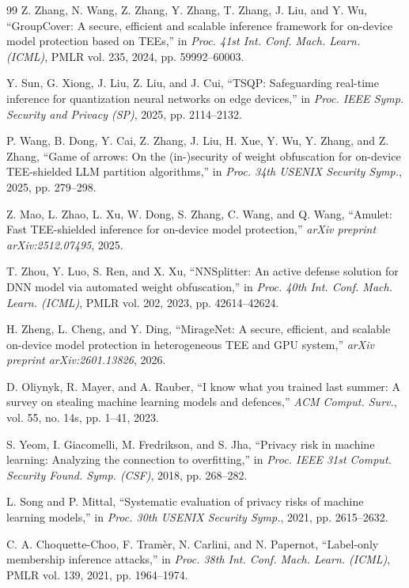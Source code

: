 \documentclass[lettersize,journal]{IEEEtran}
\begin{document}
\begin{thebibliography}{99}
Z. Zhang, N. Wang, Z. Zhang, Y. Zhang, T. Zhang, J. Liu, and Y. Wu, ``GroupCover: A secure, efficient and scalable inference framework for on-device model protection based on TEEs,'' in \emph{Proc. 41st Int. Conf. Mach. Learn. (ICML)}, PMLR vol. 235, 2024, pp. 59992--60003.

Y. Sun, G. Xiong, J. Liu, Z. Liu, and J. Cui, ``TSQP: Safeguarding real-time inference for quantization neural networks on edge devices,'' in \emph{Proc. IEEE Symp. Security and Privacy (SP)}, 2025, pp. 2114--2132.

P. Wang, B. Dong, Y. Cai, Z. Zhang, J. Liu, H. Xue, Y. Wu, Y. Zhang, and Z. Zhang, ``Game of arrows: On the (in-)security of weight obfuscation for on-device TEE-shielded LLM partition algorithms,'' in \emph{Proc. 34th USENIX Security Symp.}, 2025, pp. 279--298.

Z. Mao, L. Zhao, L. Xu, W. Dong, S. Zhang, C. Wang, and Q. Wang, ``Amulet: Fast TEE-shielded inference for on-device model protection,'' \emph{arXiv preprint arXiv:2512.07495}, 2025.

T. Zhou, Y. Luo, S. Ren, and X. Xu, ``NNSplitter: An active defense solution for DNN model via automated weight obfuscation,'' in \emph{Proc. 40th Int. Conf. Mach. Learn. (ICML)}, PMLR vol. 202, 2023, pp. 42614--42624.

H. Zheng, L. Cheng, and Y. Ding, ``MirageNet: A secure, efficient, and scalable on-device model protection in heterogeneous TEE and GPU system,'' \emph{arXiv preprint arXiv:2601.13826}, 2026.

D. Oliynyk, R. Mayer, and A. Rauber, ``I know what you trained last summer: A survey on stealing machine learning models and defences,'' \emph{ACM Comput. Surv.}, vol. 55, no. 14s, pp. 1--41, 2023.

S. Yeom, I. Giacomelli, M. Fredrikson, and S. Jha, ``Privacy risk in machine learning: Analyzing the connection to overfitting,'' in \emph{Proc. IEEE 31st Comput. Security Found. Symp. (CSF)}, 2018, pp. 268--282.

L. Song and P. Mittal, ``Systematic evaluation of privacy risks of machine learning models,'' in \emph{Proc. 30th USENIX Security Symp.}, 2021, pp. 2615--2632.

C. A. Choquette-Choo, F. Tram\`{e}r, N. Carlini, and N. Papernot, ``Label-only membership inference attacks,'' in \emph{Proc. 38th Int. Conf. Mach. Learn. (ICML)}, PMLR vol. 139, 2021, pp. 1964--1974.


\end{thebibliography}
\end{document}

